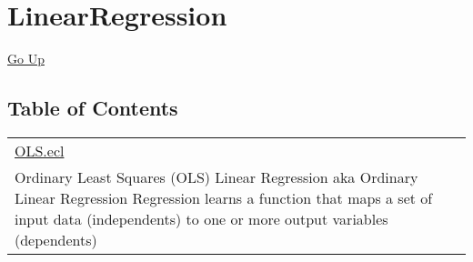 \chapter*{\color{headtoc} LinearRegression}
\hypertarget{ecldoc:toc:root/LinearRegression}{}
\hyperlink{ecldoc:toc:}{Go Up}


\section*{Table of Contents}
{\renewcommand{\arraystretch}{1.5}
\begin{longtable}{|p{\textwidth}|}
\hline
\hyperlink{ecldoc:toc:LinearRegression.OLS}{OLS.ecl} \\
Ordinary Least Squares (OLS) Linear Regression aka Ordinary Linear Regression Regression learns a function that maps a set of input data (independents) to one or more output variables (dependents) \\
\hline
\end{longtable}
}


